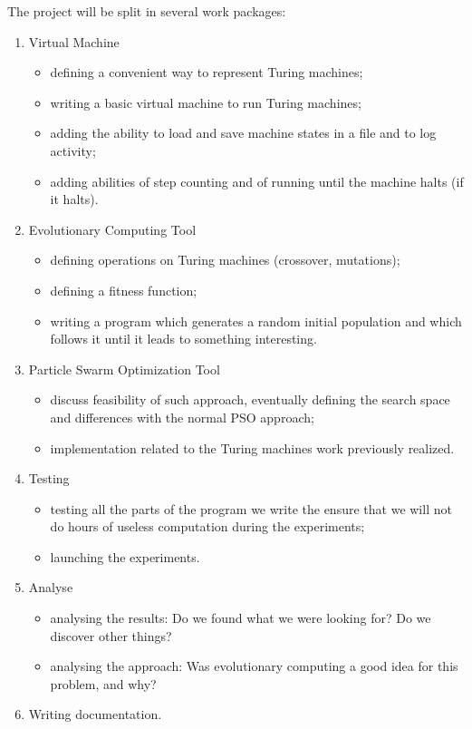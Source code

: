 \documentclass{article}
\begin{document}
The project will be split in several work packages:
\begin{enumerate}
\item Virtual Machine 
  \begin{itemize}
  \item defining a convenient way to represent Turing machines;
  \item writing a basic virtual machine to run Turing machines;
  \item adding the ability to load and save machine states in a file and to log activity;
  \item adding abilities of step counting and of running until the machine halts (if it halts).
  \end{itemize}
\item Evolutionary Computing Tool
  \begin{itemize}
  \item defining operations on Turing machines (crossover, mutations);
  \item defining a fitness function;
  \item writing a program which generates a random initial population and which follows it until it leads to something interesting.
  \end{itemize}
\item Particle Swarm Optimization Tool
  \begin{itemize}
  \item discuss feasibility of such approach, eventually defining the search space and differences with the normal PSO approach;
  \item implementation related to the Turing machines work previously realized. 
  \end{itemize}
\item Testing
  \begin{itemize}
  \item testing all the parts of the program we write the ensure that we will not do hours of useless computation during the experiments;
  \item launching the experiments.
  \end{itemize}
\item Analyse
  \begin{itemize}
  \item analysing the results: Do we found what we were looking for? Do we discover other things?
  \item analysing the approach: Was evolutionary computing a good idea for this problem, and why?
  \end{itemize}
\item Writing documentation.
\end{enumerate}
\end{document}
